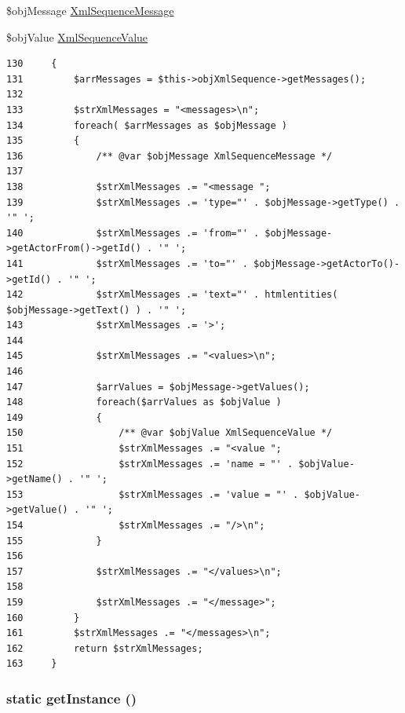 \$objMessage \hyperlink{class_xml_sequence_message}{XmlSequenceMessage}

\$objValue \hyperlink{class_xml_sequence_value}{XmlSequenceValue} 

\begin{Code}\begin{verbatim}130     {
131         $arrMessages = $this->objXmlSequence->getMessages();
132         
133         $strXmlMessages = "<messages>\n";
134         foreach( $arrMessages as $objMessage )
135         {
136             /** @var $objMessage XmlSequenceMessage */
137             
138             $strXmlMessages .= "<message ";
139             $strXmlMessages .= 'type="' . $objMessage->getType() . '" ';
140             $strXmlMessages .= 'from="' . $objMessage->getActorFrom()->getId() . '" ';
141             $strXmlMessages .= 'to="' . $objMessage->getActorTo()->getId() . '" ';
142             $strXmlMessages .= 'text="' . htmlentities( $objMessage->getText() ) . '" ';
143             $strXmlMessages .= '>';
144 
145             $strXmlMessages .= "<values>\n";
146 
147             $arrValues = $objMessage->getValues();
148             foreach($arrValues as $objValue )
149             {
150                 /** @var $objValue XmlSequenceValue */
151                 $strXmlMessages .= "<value ";
152                 $strXmlMessages .= 'name = "' . $objValue->getName() . '" ';
153                 $strXmlMessages .= 'value = "' . $objValue->getValue() . '" ';
154                 $strXmlMessages .= "/>\n";
155             }
156 
157             $strXmlMessages .= "</values>\n";
158 
159             $strXmlMessages .= "</message>";
160         }
161         $strXmlMessages .= "</messages>\n";
162         return $strXmlMessages;
163     }
\end{verbatim}
\end{Code}


\hypertarget{class_xml_sequence_printer_xml_c93fbec81f07e5d15f80db907e63dc10}{
\subsubsection[{getInstance}]{\setlength{\rightskip}{0pt plus 5cm}static getInstance ()}}
\label{class_xml_sequence_printer_xml_c93fbec81f07e5d15f80db907e63dc10}


